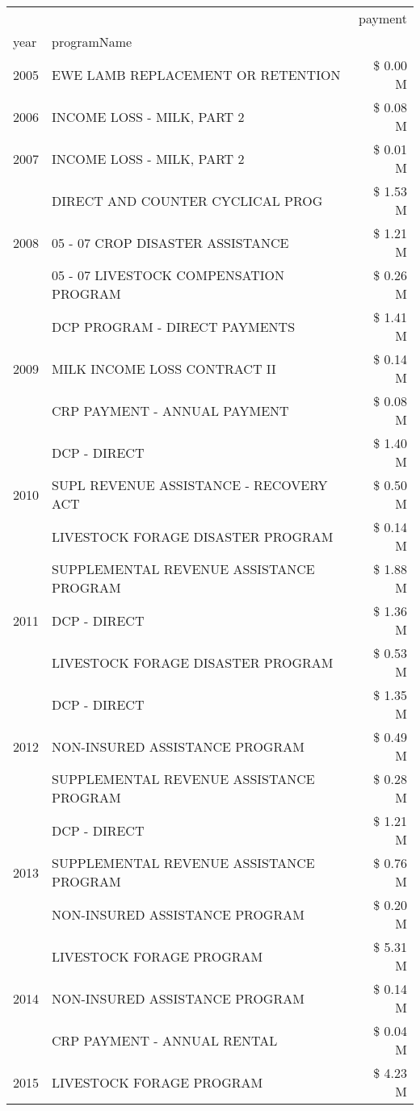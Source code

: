 \begin{tabular}{llr}
\toprule
 &  & payment \\
year & programName &  \\
\midrule
2005 & EWE LAMB REPLACEMENT OR RETENTION & \$ 0.00 M \\
\cline{1-3}
2006 & INCOME LOSS - MILK, PART 2 & \$ 0.08 M \\
\cline{1-3}
2007 & INCOME LOSS - MILK, PART 2 & \$ 0.01 M \\
\cline{1-3}
\multirow[t]{3}{*}{2008} & DIRECT AND COUNTER CYCLICAL PROG & \$ 1.53 M \\
 & 05 - 07 CROP DISASTER ASSISTANCE & \$ 1.21 M \\
 & 05 - 07 LIVESTOCK COMPENSATION PROGRAM & \$ 0.26 M \\
\cline{1-3}
\multirow[t]{3}{*}{2009} & DCP PROGRAM - DIRECT PAYMENTS & \$ 1.41 M \\
 & MILK INCOME LOSS CONTRACT II & \$ 0.14 M \\
 & CRP PAYMENT - ANNUAL PAYMENT & \$ 0.08 M \\
\cline{1-3}
\multirow[t]{3}{*}{2010} & DCP - DIRECT & \$ 1.40 M \\
 & SUPL REVENUE ASSISTANCE - RECOVERY ACT & \$ 0.50 M \\
 & LIVESTOCK FORAGE DISASTER PROGRAM & \$ 0.14 M \\
\cline{1-3}
\multirow[t]{3}{*}{2011} & SUPPLEMENTAL REVENUE ASSISTANCE PROGRAM & \$ 1.88 M \\
 & DCP - DIRECT & \$ 1.36 M \\
 & LIVESTOCK FORAGE DISASTER PROGRAM & \$ 0.53 M \\
\cline{1-3}
\multirow[t]{3}{*}{2012} & DCP - DIRECT & \$ 1.35 M \\
 & NON-INSURED ASSISTANCE PROGRAM & \$ 0.49 M \\
 & SUPPLEMENTAL REVENUE ASSISTANCE PROGRAM & \$ 0.28 M \\
\cline{1-3}
\multirow[t]{3}{*}{2013} & DCP - DIRECT & \$ 1.21 M \\
 & SUPPLEMENTAL REVENUE ASSISTANCE PROGRAM & \$ 0.76 M \\
 & NON-INSURED ASSISTANCE PROGRAM & \$ 0.20 M \\
\cline{1-3}
\multirow[t]{3}{*}{2014} & LIVESTOCK FORAGE PROGRAM & \$ 5.31 M \\
 & NON-INSURED ASSISTANCE PROGRAM & \$ 0.14 M \\
 & CRP PAYMENT - ANNUAL RENTAL & \$ 0.04 M \\
\cline{1-3}
\multirow[t]{3}{*}{2015} & LIVESTOCK FORAGE PROGRAM & \$ 4.23 M \\

\end{tabular}
